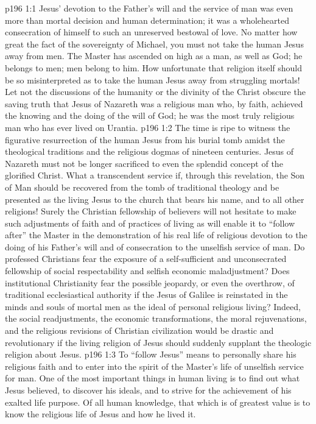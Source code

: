 \vs p196 1:1 Jesus’ devotion to the Father’s will and the service of man was even more than mortal decision and human determination; it was a wholehearted consecration of himself to such an unreserved bestowal of love. No matter how great the fact of the sovereignty of Michael, you must not take the human Jesus away from men. The Master has ascended on high as a man, as well as God; he belongs to men; men belong to him. How unfortunate that religion itself should be so misinterpreted as to take the human Jesus away from struggling mortals! Let not the discussions of the humanity or the divinity of the Christ obscure the saving truth that Jesus of Nazareth was a religious man who, by faith, achieved the knowing and the doing of the will of God; he was the most truly religious man who has ever lived on Urantia.
\vs p196 1:2 The time is ripe to witness the figurative resurrection of the human Jesus from his burial tomb amidst the theological traditions and the religious dogmas of nineteen centuries. Jesus of Nazareth must not be longer sacrificed to even the splendid concept of the glorified Christ. What a transcendent service if, through this revelation, the Son of Man should be recovered from the tomb of traditional theology and be presented as the living Jesus to the church that bears his name, and to all other religions! Surely the Christian fellowship of believers will not hesitate to make such adjustments of faith and of practices of living as will enable it to “follow after” the Master in the demonstration of his real life of religious devotion to the doing of his Father’s will and of consecration to the unselfish service of man. Do professed Christians fear the exposure of a self\hyp{}sufficient and unconsecrated fellowship of social respectability and selfish economic maladjustment? Does institutional Christianity fear the possible jeopardy, or even the overthrow, of traditional ecclesiastical authority if the Jesus of Galilee is reinstated in the minds and souls of mortal men as the ideal of personal religious living? Indeed, the social readjustments, the economic transformations, the moral rejuvenations, and the religious revisions of Christian civilization would be drastic and revolutionary if the living religion of Jesus should suddenly supplant the theologic religion about Jesus.
\pc \vs p196 1:3 To “follow Jesus” means to personally share his religious faith and to enter into the spirit of the Master’s life of unselfish service for man. One of the most important things in human living is to find out what Jesus believed, to discover his ideals, and to strive for the achievement of his exalted life purpose. Of all human knowledge, that which is of greatest value is to know the religious life of Jesus and how he lived it.

